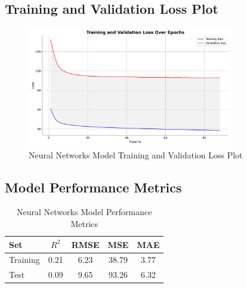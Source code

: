 \subsection{Training and Validation Loss Plot}

\begin{figure}[H]
    \centering
    \includegraphics[width=0.8\textwidth]{figures/nn_training_loss.png}
    \caption{Neural Networks Model Training and Validation Loss Plot}
    \label{fig:neural_networks_loss_plot}
\end{figure}


\subsection{Model Performance Metrics}

\begin{table}[H]
    \centering
    \caption{Neural Networks Model Performance Metrics}
    \label{tab:neural_networks_performance}
    \begin{tabular}{lcccc}
    \hline
    Set & $R^2$ & RMSE & MSE & MAE \\ 
    \hline
    Training & 0.21 & 6.23 & 38.79 & 3.77 \\
    Test & 0.09 & 9.65 & 93.26 & 6.32 \\
    \hline
    \end{tabular}

\end{table}



